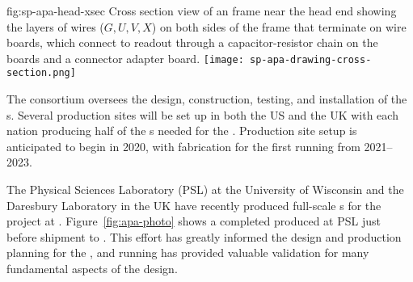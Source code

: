 \begin{dunefigure}{fig:sp-apa-head-xsec}
{Cross section view of an  frame near the head end showing the layers of wires ($G,U,V,X$) on both sides of the frame that terminate on wire boards, which connect to  readout  through a capacitor-resistor chain on the  boards and a connector adapter board.} 
\texttt{[image: sp-apa-drawing-cross-section.png]} 
\end{dunefigure} 


The  consortium %
oversees the design, construction, testing, and installation of the s. Several  production sites will be set up in both the US and the UK with each nation producing  half of the s needed for the %
.  Production site setup is anticipated to begin in 2020, with  fabrication for the first \nominalmodsize {} running from 2021--2023.  

The Physical Sciences Laboratory (PSL) at the University of Wisconsin and the Daresbury Laboratory in the UK have recently produced full-scale s for the  project at . Figure~\ref{fig:apa-photo} shows a completed  produced at PSL just before shipment to . %
This effort has greatly informed the design and production planning for the  , and  running has provided valuable validation for many fundamental aspects of the   design. 

